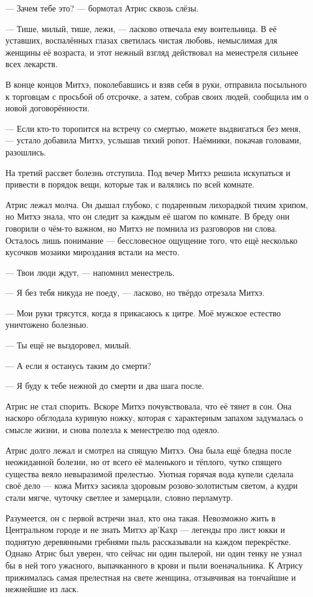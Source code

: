 --- Зачем тебе это? --- бормотал Атрис сквозь слёзы.

--- Тише, милый, тише, лежи, --- ласково отвечала ему воительница.
В её уставших, воспалённых глазах светилась чистая любовь, немыслимая для женщины её возраста, и этот нежный взгляд действовал на менестреля сильнее всех лекарств.

В конце концов Митхэ, поколебавшись и взяв себя в руки, отправила посыльного к торговцам с просьбой об отсрочке, а затем, собрав своих людей, сообщила им о новой договорённости.

--- Если кто-то торопится на встречу со смертью, можете выдвигаться без меня, --- устало добавила Митхэ, услышав тихий ропот.
Наёмники, покачав головами, разошлись.

На третий рассвет болезнь отступила.
Под вечер Митхэ решила искупаться и привести в порядок вещи, которые так и валялись по всей комнате.

Атрис лежал молча.
Он дышал глубоко, с подаренным лихорадкой тихим хрипом, но Митхэ знала, что он следит за каждым её шагом по комнате.
В бреду они говорили о чём-то важном, но Митхэ не помнила из разговоров ни слова.
Осталось лишь понимание --- бессловесное ощущение того, что ещё несколько кусочков мозаики мироздания встали на место.

--- Твои люди ждут, --- напомнил менестрель.

--- Я без тебя никуда не поеду, --- ласково, но твёрдо отрезала Митхэ.

--- Мои руки трясутся, когда я прикасаюсь к цитре.
Моё мужское естество уничтожено болезнью.

--- Ты ещё не выздоровел, милый.

--- А если я останусь таким до смерти?

--- Я буду к тебе нежной до смерти и два шага после.

Атрис не стал спорить.
Вскоре Митхэ почувствовала, что её тянет в сон.
Она наскоро обглодала куриную ножку, которая с характерным запахом задумалась о смысле жизни, и снова полезла к менестрелю под одеяло.

Атрис долго лежал и смотрел на спящую Митхэ.
Она была ещё бледна после неожиданной болезни, но от всего её маленького и тёплого, чутко спящего существа веяло невыразимой прелестью.
Уютная горячая вода купели сделала своё дело --- кожа Митхэ засияла здоровым розово-золотистым светом, а кудри стали мягче, чуточку светлее и замерцали, словно перламутр.

Разумеется, он с первой встречи знал, кто она такая.
Невозможно жить в Центральном городе и не знать Митхэ ар'Кахр --- легенды про лист юкки и поднятую деревянными гребнями пыль рассказывали на каждом перекрёстке.
Однако Атрис был уверен, что сейчас ни один пылерой, ни один тенку не узнал бы в ней того ужасного, выпачканного в крови и пыли военачальника.
К Атрису прижималась самая прелестная на свете женщина, отзывчивая на тончайшие и нежнейшие из ласк.

